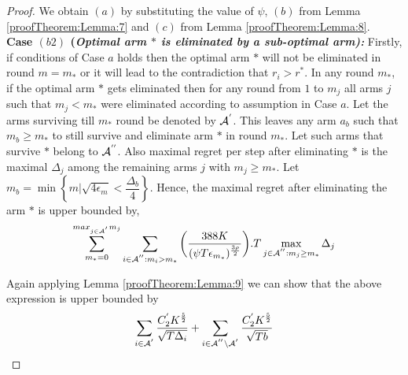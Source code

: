 \begin{proof}
We obtain $(a)$ by substituting the value of $\psi$, $(b)$ from Lemma \ref{proofTheorem:Lemma:7} and $(c)$ from Lemma \ref{proofTheorem:Lemma:8}.\\

\noindent
\textbf{Case $(b2)$ (\textit{Optimal arm ${*}$ is eliminated by a sub-optimal arm):  }} Firstly, if conditions of Case $a$ holds then the optimal arm ${*}$ will not be eliminated in round $m=m_{*}$ or it will lead to the contradiction that $r_{i}>r^{*}$. In any round $m_{*}$, if the optimal arm ${*}$ gets eliminated then for any round from $1$ to $m_{j}$ all arms ${j}$ such that $m_{j}< m_{*}$ were eliminated according to assumption in Case $a$. Let the arms surviving till $m_{*}$ round be denoted by $\mathcal{A}^{'}$. This leaves any arm $a_{b}$ such that $m_{b}\geq m_{*}$ to still survive and eliminate arm ${*}$ in round $m_{*}$. Let such arms that survive ${*}$ belong to $\mathcal{A}^{''}$. Also maximal regret per step after eliminating ${*}$ is the maximal $\Delta_{j}$ among the remaining arms ${j}$ with $m_{j}\geq m_{*}$.  Let $m_{b}=\min\left\lbrace m|\sqrt{4\epsilon_{m}}<\dfrac{\Delta_{b}}{4}\right\rbrace$. Hence, the maximal regret after eliminating the arm ${*}$ is upper bounded by, 
\begin{align*}
\sum_{m_{*}=0}^{max_{j\in \mathcal{A}^{'}}m_{j}}\sum_{i\in \mathcal{A}^{''}:m_{i}>m_{*}}\bigg(\dfrac{388 K}{(\psi  T\epsilon_{m_{*}})^{\frac{3\rho}{2}}} \bigg).T\max_{j\in \mathcal{A}^{''}:m_{j}\geq m_{*}}{\Delta}_{j}
\end{align*}

Again applying Lemma \ref{proofTheorem:Lemma:9} we can show that the above expression is upper bounded by 
\begin{align*}
\sum_{i\in \mathcal{A}^{'}}\dfrac{C_2^{'} K^{\frac{5}{2}}}{\sqrt{T\Delta_i}} +\sum_{i\in \mathcal{A}^{''}\setminus \mathcal{A}^{'}}\dfrac{C_2^{'} K^{\frac{5}{2}}}{\sqrt{T b}}
\end{align*}



\end{proof}
